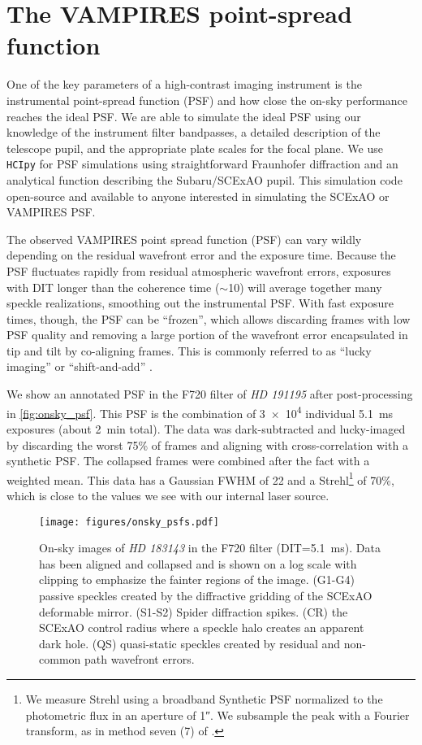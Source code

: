 \section{The VAMPIRES point-spread function}\label{sec:psf}

One of the key parameters of a high-contrast imaging instrument is the instrumental point-spread function (PSF) and how close the on-sky performance reaches the ideal PSF. We are able to simulate the ideal PSF using our knowledge of the instrument filter bandpasses, a detailed description of the telescope pupil, and the appropriate plate scales for the focal plane. We use \texttt{HCIpy} \citep{por_high_2018} for PSF simulations using straightforward Fraunhofer diffraction and an analytical function describing the Subaru/SCExAO pupil. This simulation code open-source and available to anyone interested in simulating the SCExAO or VAMPIRES PSF.

The observed VAMPIRES point spread function (PSF) can vary wildly depending on the residual wavefront error and the exposure time. Because the PSF fluctuates rapidly from residual atmospheric wavefront errors, exposures with DIT longer than the coherence time ($\sim$\SI{10}{\millisecond}) will average together many speckle realizations, smoothing out the instrumental PSF. With fast exposure times, though, the PSF can be ``frozen'', which allows discarding frames with low PSF quality and removing a large portion of the wavefront error encapsulated in tip and tilt by co-aligning frames. This is commonly referred to as ``lucky imaging'' or ``shift-and-add'' \citep{garrel_highly_2012}.

We show an annotated PSF in the F720 filter of \textit{HD 191195} after post-processing in \autoref{fig:onsky_psf}. This PSF is the combination of \num{3e4} individual \SI{5.1}{\milli\second} exposures (about \SI{2}{\minute} total). The data was dark-subtracted and lucky-imaged by discarding the worst 75\% of frames and aligning with cross-correlation with a synthetic PSF. The collapsed frames were combined after the fact with a weighted mean. This data has a Gaussian FWHM of \SI{22}{\milliarcsecond} and a Strehl\footnote{We measure Strehl using a broadband Synthetic PSF normalized to the photometric flux in an aperture of \ang{;;1}.  We subsample the peak with a Fourier transform, as in method seven (7) of \citep{jr_is_2004}.} of 70\%, which is close to the values we see with our internal laser source.


\begin{figure}
    \centering
    \texttt{[image: figures/onsky\_psfs.pdf]}
    \caption{On-sky images of \textit{HD 183143} in the F720 filter (DIT=\SI{5.1}{\milli\second}). Data has been aligned and collapsed and is shown on a log scale with clipping to emphasize the fainter regions of the image. (G1-G4) passive speckles created by the diffractive gridding of the SCExAO deformable mirror. (S1-S2) Spider diffraction spikes. (CR) the SCExAO control radius where a speckle halo creates an apparent dark hole. (QS) quasi-static speckles created by residual and non-common path wavefront errors.\label{fig:onsky_psf}}
\end{figure}

